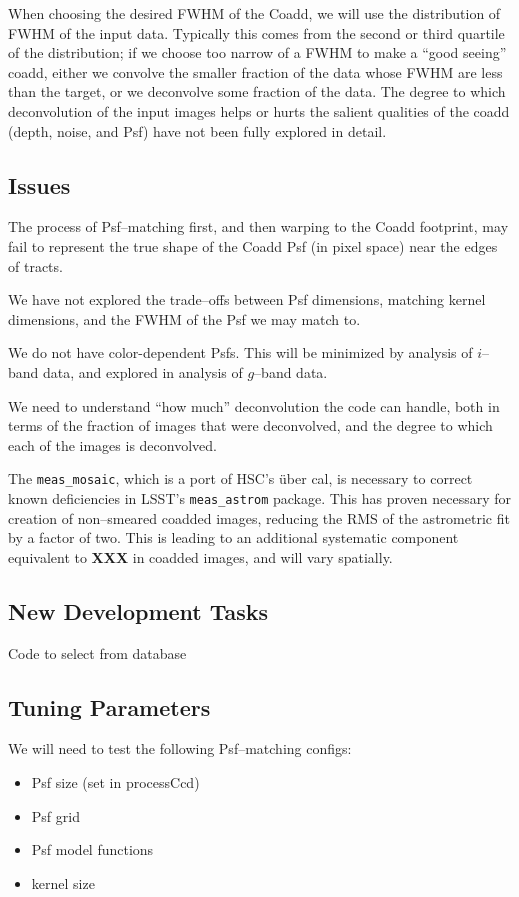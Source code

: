 \documentclass[12pt]{article}
\begin{document}
When choosing the desired FWHM of the Coadd, we will use the
distribution of FWHM of the input data.  Typically this comes from the
second or third quartile of the distribution; if we choose too narrow
of a FWHM to make a ``good seeing'' coadd, either we convolve the
smaller fraction of the data whose FWHM are less than the target, or
we deconvolve some fraction of the data.  The degree to which
deconvolution of the input images helps or hurts the salient qualities
of the coadd (depth, noise, and Psf) have not been fully explored in
detail.

\subsection{Issues}

The process of Psf--matching first, and then warping to the Coadd
footprint, may fail to represent the true shape of the Coadd Psf (in
pixel space) near the edges of tracts.

We have not explored the trade--offs between Psf dimensions, matching
kernel dimensions, and the FWHM of the Psf we may match to.

We do not have color-dependent Psfs.  This will be minimized by
analysis of $i$--band data, and explored in analysis of $g$--band
data.

We need to understand ``how much'' deconvolution the code can handle,
both in terms of the fraction of images that were deconvolved, and the
degree to which each of the images is deconvolved.

The {\tt meas\_mosaic}, which is a port of HSC's \"{u}ber cal, is
necessary to correct known deficiencies in LSST's {\tt meas\_astrom}
package.  This has proven necessary for creation of non--smeared
coadded images, reducing the RMS of the astrometric fit by a factor of
two.  This is leading to an additional systematic component equivalent
to {\bf XXX} in coadded images, and will vary spatially.

\subsection{New Development Tasks}

Code to select from database

\subsection{Tuning Parameters}
We will need to test the following Psf--matching configs:
\begin{itemize}
\item Psf size (set in processCcd)
\item Psf grid 
\item Psf model functions
\item kernel size
\end{itemize}
\end{document}
